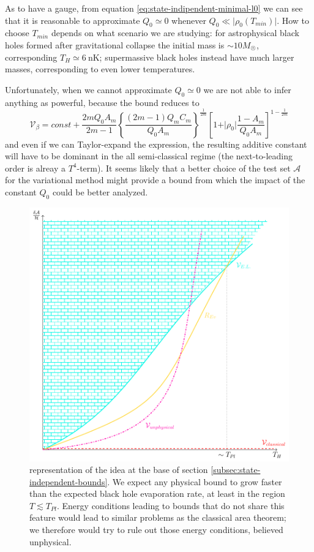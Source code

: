 As to have a gauge, from equation \eqref{eq:state-indipendent-minimal-l0} we can see that it is reasonable to approximate \(Q_0\simeq 0\) whenever \(Q_0 \ll \vert\rho_0(T_{min})\vert\). How to choose \(T_{min}\) depends on what scenario we are studying: for astrophysical black holes formed after gravitational collapse the initial mass is \(\sim 10 M_{\astrosun}\), corresponding \(T_H \simeq \SI{6}{\nano\kelvin}\); supermassive black holes instead have much larger masses, corresponding to even lower temperatures.

Unfortunately, when we cannot approximate \(Q_0 \simeq 0\) we are not able to infer anything as powerful, because the bound reduces to 
\begin{equation}
	\label{eq:state-independent-bound}
	\mathcal{V}_{\beta} = const + \frac{2mQ_0A_m}{2m - 1} \left\{\frac{(2m - 1)Q_mC_m}{Q_0A_m}\right\}^{\frac{1}{2m}} \left[1 + \vert\rho_0\vert\frac{1-A_m}{Q_0A_m}\right]^{1-\frac{1}{2m}}
\end{equation}
and even if we can Taylor-expand the expression, the resulting additive constant will have to be dominant in the all semi-classical regime (the next-to-leading order is alreay a \(T^4\)-term). It seems likely that a better choice of the test set \(\mathcal{A}\) for the variational method might provide a bound from which the impact of the constant \(Q_0\) could be better analyzed.	

\begin{figure}
	\centering
	\includegraphics[scale=0.77]{Immagini/state-independent-bounds/state-independent-bounds.pdf}
	\caption[]{representation of the idea at the base of section \ref{subsec:state-independent-bounds}. We expect any physical bound to grow faster than the expected black hole evaporation rate, at least in the region \(T \lesssim T_{Pl}\). Energy conditions leading to bounds that do not share this feature would lead to similar problems as the classical area theorem; we therefore would try to rule out those energy conditions, believed unphysical.}
	\label{fig:state-independent-bounds}
\end{figure}

